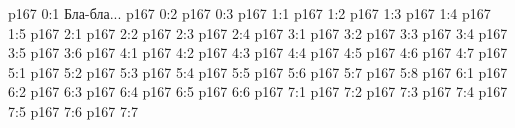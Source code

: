 \author{Промежуточные создания}
\vs p167 0:1  Бла-бла...
\vs p167 0:2 
\vs p167 0:3 \pc 
{}
\vs p167 1:1 
\vs p167 1:2 
\vs p167 1:3 
\vs p167 1:4 
\vs p167 1:5 \pc 
{}
\vs p167 2:1 
\vs p167 2:2 
\vs p167 2:3 \pc 
\vs p167 2:4 
\vs p167 3:1 
\vs p167 3:2 
\vs p167 3:3 
\vs p167 3:4 
\vs p167 3:5 \pc 
\vs p167 3:6 \pc 
{}
\vs p167 4:1 
\vs p167 4:2 \pc 
\vs p167 4:3 \pc 
\vs p167 4:4 \pc 
\vs p167 4:5 
\vs p167 4:6 
\vs p167 4:7 
\vs p167 5:1 
\vs p167 5:2 \pc 
\vs p167 5:3 
\vs p167 5:4 
\vs p167 5:5 
\vs p167 5:6 
\vs p167 5:7 
\vs p167 5:8 
\vs p167 6:1 
\vs p167 6:2 
\vs p167 6:3 \pc 
\vs p167 6:4 \pc 
\vs p167 6:5 \pc 
\vs p167 6:6 
\vs p167 7:1 
\vs p167 7:2 \pc 
\vs p167 7:3 
\vs p167 7:4 
\vs p167 7:5 
\vs p167 7:6 
\vs p167 7:7 \pc 
\quizlink
